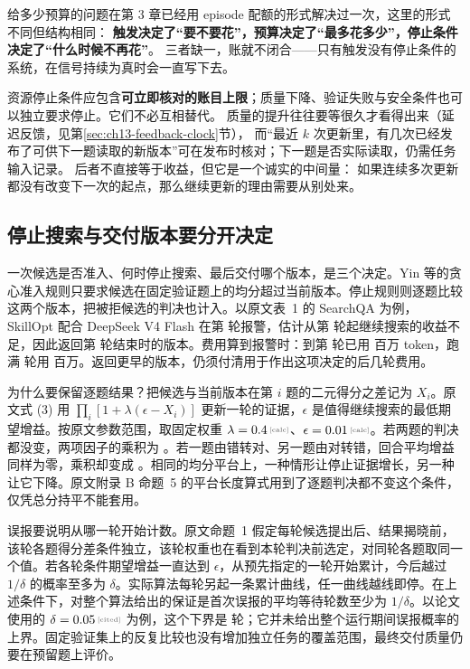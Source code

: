 给多少预算的问题在第 3 章已经用 episode 配额的形式解决过一次，这里的形式不同但结构相同：
\textbf{触发决定了“要不要花”，预算决定了“最多花多少”，停止条件决定了“什么时候不再花”}。
三者缺一，账就不闭合——只有触发没有停止条件的系统，在信号持续为真时会一直写下去。

资源停止条件应包含\textbf{可立即核对的账目上限}；质量下降、验证失败与安全条件也可以独立要求停止。它们不必互相替代。
质量的提升往往要等很久才看得出来（延迟反馈，见第\ref{sec:ch13-feedback-clock}节），
而“最近 $k$ 次更新里，有几次已经发布了可供下一题读取的新版本”可在发布时核对；下一题是否实际读取，仍需任务输入记录。
后者不直接等于收益，但它是一个诚实的中间量：
如果连续多次更新都没有改变下一次的起点，那么继续更新的理由需要从别处来。

\subsection{停止搜索与交付版本要分开决定}
\label{sec:ch13-stop-output}

一次候选是否准入、何时停止搜索、最后交付哪个版本，是三个决定。Yin 等的贪心准入规则只要求候选在固定验证题上的均分超过当前版本。停止规则则逐题比较这两个版本，把被拒候选的判决也计入。以原文表~1 的 SearchQA 为例，SkillOpt 配合 DeepSeek V4 Flash 在第  轮报警，估计从第  轮起继续搜索的收益不足，因此返回第  轮结束时的版本。费用算到报警时：到第  轮已用  百万 token，跑满  轮用  百万。返回更早的版本，仍须付清用于作出这项决定的后几轮费用\cite{enough-enough-2610}。

为什么要保留逐题结果？把候选与当前版本在第 $i$ 题的二元得分之差记为 $X_i$。原文式 (3) 用 $\prod_i[1+\lambda(\epsilon-X_i)]$ 更新一轮的证据，$\epsilon$ 是值得继续搜索的最低期望增益。按原文参数范围，取固定权重 $\lambda=\calcnum{0.4}$、$\epsilon=\calcnum{0.01}$。若两题的判决都没变，两项因子的乘积为 。若一题由错转对、另一题由对转错，回合平均增益同样为零，乘积却变成 。相同的均分平台上，一种情形让停止证据增长，另一种让它下降。原文附录 B 命题~5 的平台长度算式用到了逐题判决都不变这个条件，仅凭总分持平不能套用。

误报要说明从哪一轮开始计数。原文命题~1 假定每轮候选提出后、结果揭晓前，该轮各题得分差条件独立，该轮权重也在看到本轮判决前选定，对同轮各题取同一个值。若各轮条件期望增益一直达到 $\epsilon$，从预先指定的一轮开始累计，今后越过 $1/\delta$ 的概率至多为 $\delta$。实际算法每轮另起一条累计曲线，任一曲线越线即停。在上述条件下，对整个算法给出的保证是首次误报的平均等待轮数至少为 $1/\delta$。以论文使用的 $\delta=\cited{0.05}$ 为例，这个下界是  轮；它并未给出整个运行期间误报概率的  上界。固定验证集上的反复比较也没有增加独立任务的覆盖范围，最终交付质量仍要在预留题上评价。

